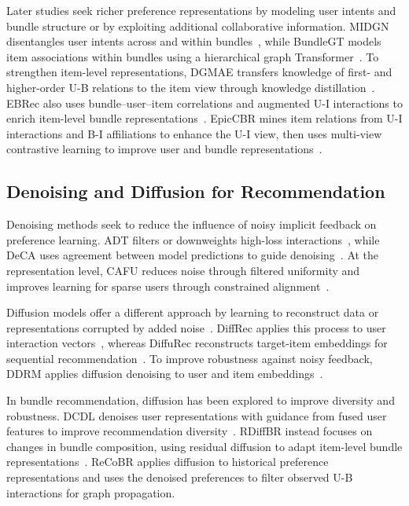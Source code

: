 \documentclass[letterpaper,journal]{IEEEtran}
\begin{document}
Later studies seek richer preference representations by modeling user intents and bundle structure or by exploiting additional collaborative information. MIDGN disentangles user intents across and within bundles~\cite{zhao2022midgn}, while BundleGT models item associations within bundles using a hierarchical graph Transformer~\cite{wei2023bundlegt}. To strengthen item-level representations, DGMAE transfers knowledge of first- and higher-order U-B relations to the item view through knowledge distillation~\cite{ren2023dgmae}. EBRec also uses bundle--user--item correlations and augmented U-I interactions to enrich item-level bundle representations~\cite{du2025ebrec}. EpicCBR mines item relations from U-I interactions and B-I affiliations to enhance the U-I view, then uses multi-view contrastive learning to improve user and bundle representations~\cite{li2026epiccbr}.

\subsection{Denoising and Diffusion for Recommendation}

Denoising methods seek to reduce the influence of noisy implicit feedback on preference learning. ADT filters or downweights high-loss interactions~\cite{wang2021adt}, while DeCA uses agreement between model predictions to guide denoising~\cite{wang2022deca}. At the representation level, CAFU reduces noise through filtered uniformity and improves learning for sparse users through constrained alignment~\cite{jiang2026cafu}.

Diffusion models offer a different approach by learning to reconstruct data or representations corrupted by added noise~\cite{ho2020ddpm}. DiffRec applies this process to user interaction vectors~\cite{wang2023diffrec}, whereas DiffuRec reconstructs target-item embeddings for sequential recommendation~\cite{li2023diffurec}. To improve robustness against noisy feedback, DDRM applies diffusion denoising to user and item embeddings~\cite{zhao2024ddrm}.

In bundle recommendation, diffusion has been explored to improve diversity and robustness. DCDL denoises user representations with guidance from fused user features to improve recommendation diversity~\cite{chen2025dcdl}. RDiffBR instead focuses on changes in bundle composition, using residual diffusion to adapt item-level bundle representations~\cite{zhang2026rdiffbr}. ReCoBR applies diffusion to historical preference representations and uses the denoised preferences to filter observed U-B interactions for graph propagation.
\end{document}

